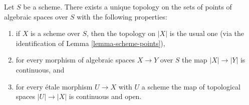 \begin{lemma}
\label{lemma-topology-points}
Let $S$ be a scheme. There exists a unique topology on the sets of points
of algebraic spaces over $S$ with the following properties:
\begin{enumerate}
\item if $X$ is a scheme over $S$, then the topology on $|X|$ is the usual one
(via the identification of Lemma \ref{lemma-scheme-points}),
\item for every morphism of algebraic spaces $X \to Y$ over $S$
the map $|X| \to |Y|$ is continuous, and
\item for every \'etale morphism $U \to X$ with $U$ a scheme
the map of topological spaces $|U| \to |X|$ is continuous and open.
\end{enumerate}
\end{lemma}

